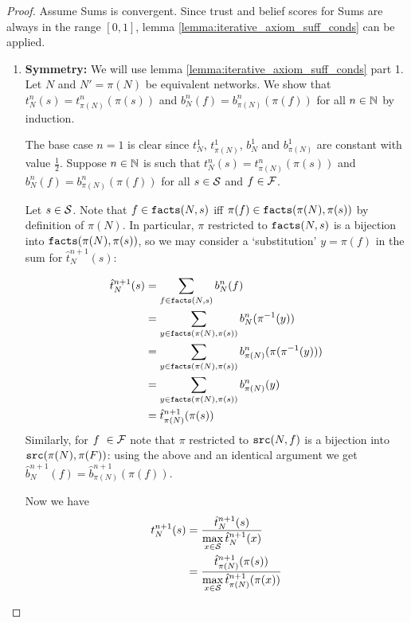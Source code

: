 \documentclass[../main.tex]{subfiles}
\begin{document}
\begin{proof}
Assume Sums is convergent. Since trust and belief scores for Sums are always in
the range $[0, 1]$, lemma \ref{lemma:iterative_axiom_suff_conds} can be
applied.

\begin{enumerate}

\item\textbf{Symmetry:} We will use lemma
\ref{lemma:iterative_axiom_suff_conds} part 1. Let $N$ and $N'=\pi(N)$ be
equivalent networks. We show that $t_N^n(s) = t_{\pi(N)}^n(\pi(s))$ and
$b_N^n(f) = b_{\pi(N)}^n(\pi(f))$ for all $n \in \Nat$ by induction.

The base case $n=1$ is clear since $t_N^1$, $t_{\pi(N)}^1$, $b_N^1$ and
$b_{\pi(N)}^1$ are constant with value $\frac{1}{2}$. Suppose $n \in \Nat$ is
such that $t_N^n(s) = t_{\pi(N)}^n(\pi(s))$ and $b_N^n(f) =
b_{\pi(N)}^n(\pi(f))$ for all $s \in \S$ and $f \in \F$.

Let $s \in \S$. Note that $f \in \fact(N, s)$ iff $\pi(f) \in \fact(\pi(N),
\pi(s))$ by definition of $\pi(N)$. In particular, $\pi$ restricted to
$\fact(N, s)$ is a bijection into $\fact(\pi(N), \pi(s))$, so we may consider a
`substitution' $y = \pi(f)$ in the sum for $\hat{t}_N^{n+1}(s)$:

\begin{align*}
    \hat{t}_N^{n+1}(s) & = \sum_{f \in \fact(N, s)}{b_N^n(f)} \\
                       & = \sum_{y \in \fact(\pi(N), \pi(s))}{b_N^n(\pi^{-1}(y))} \\
                       & = \sum_{y \in \fact(\pi(N), \pi(s))}{b_{\pi(N)}^n(\pi(\pi^{-1}(y)))} \\
                       & = \sum_{y \in \fact(\pi(N), \pi(s))}{b_{\pi(N)}^n(y)} \\
                       & = \hat{t}_{\pi(N)}^{n+1}(\pi(s))
\end{align*}
Similarly, for $f\ \in \F$ note that $\pi$ restricted to $\src(N, f)$ is a
bijection into $\src(\pi(N), \pi(F))$: using the above and an identical
argument we get $\hat{b}_N^{n+1}(f) = \hat{b}_{\pi(N)}^{n+1}(\pi(f))$.

Now we have
\begin{align*}
    t_N^{n+1}(s)
    & = \frac{\hat{t}_N^{n + 1}(s)}{\max\limits_{x \in \S}{\hat{t}_N^{n + 1}(x)}} \\
    & = \frac{\hat{t}_{\pi(N)}^{n + 1}(\pi(s))}{\max\limits_{x \in
    \S}{\hat{t}_{\pi(N)}^{n + 1}(\pi(x))}} \\
\end{align*}


\end{enumerate}
\end{proof}
\end{document}
